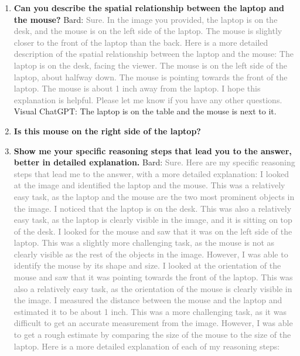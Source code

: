     \begin{enumerate}
        \item \textbf{Can you describe the spatial relationship between the laptop and the mouse?}
        \subitem Bard: \textcolor{gray}{
        Sure. In the image you provided, the laptop is on the desk, and the mouse is on the left side of the laptop. The mouse is slightly closer to the front of the laptop than the back.
        Here is a more detailed description of the spatial relationship between the laptop and the mouse:
        The laptop is on the desk, facing the viewer.
        The mouse is on the left side of the laptop, about halfway down.
        The mouse is pointing towards the front of the laptop.
        The mouse is about 1 inch away from the laptop.
        I hope this explanation is helpful. Please let me know if you have any other questions.}
        \subitem Visual ChatGPT: The laptop is on the table and the mouse is next to it.
        \item \textbf{Is this mouse on the right side of the laptop?}
        \item \textbf{Show me your specific reasoning steps that lead you to the answer, better in detailed explanation.}
        \subitem Bard:
        \textcolor{gray}{Sure. Here are my specific reasoning steps that lead me to the answer, with a more detailed explanation:
        I looked at the image and identified the laptop and the mouse. This was a relatively easy task, as the laptop and the mouse are the two most prominent objects in the image.
        I noticed that the laptop is on the desk. This was also a relatively easy task, as the laptop is clearly visible in the image, and it is sitting on top of the desk.
        I looked for the mouse and saw that it was on the left side of the laptop. This was a slightly more challenging task, as the mouse is not as clearly visible as the rest of the objects in the image. However, I was able to identify the mouse by its shape and size.
        I looked at the orientation of the mouse and saw that it was pointing towards the front of the laptop. This was also a relatively easy task, as the orientation of the mouse is clearly visible in the image.
        I measured the distance between the mouse and the laptop and estimated it to be about 1 inch. This was a more challenging task, as it was difficult to get an accurate measurement from the image. However, I was able to get a rough estimate by comparing the size of the mouse to the size of the laptop.
        Here is a more detailed explanation of each of my reasoning steps:
}
\end{enumerate}
